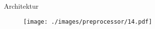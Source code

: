 \begin{frame}{Architektur}
    \begin{figure}
    	\centering
    	\texttt{[image: ./images/preprocessor/14.pdf]}
    \end{figure}
\end{frame}

